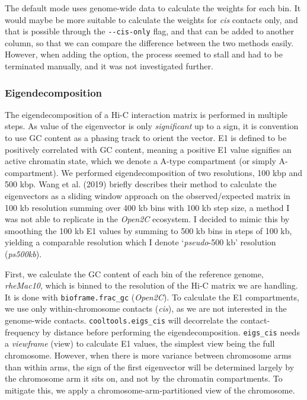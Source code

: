 \documentclass[
  11pt,
  a4paper,
]{scrbook}
\begin{document}
The default mode uses genome-wide data to calculate the weights for each
bin. It would maybe be more suitable to calculate the weights for
\emph{cis} contacts only, and that is possible through the
\texttt{-\/-cis-only} flag, and that can be added to another column, so
that we can compare the difference between the two methods easily.
However, when adding the option, the process seemed to stall and had to
be terminated manually, and it was not investigated further.

\subsubsection{Eigendecomposition}\label{sec-methods-eigendecomposition}

The eigendecomposition of a Hi-C interaction matrix is performed in
multiple steps. As value of the eigenvector is only \emph{significant}
up to a sign, it is convention to use GC content as a phasing track to
orient the vector. E1 is defined to be positively correlated with GC
content, meaning a positive E1 value signifies an active chromatin
state, which we denote a A-type compartment (or simply A-compartment).
We performed eigendecomposition of two resolutions, 100 kbp and 500 kbp.
Wang et al. (2019) briefly describes their method to calculate the
eigenvectors as a sliding window approach on the observed/expected
matrix in 100 kb resolution summing over 400 kb bins with 100 kb step
size, a method I was not able to replicate in the \emph{Open2C}
ecosystem. I decided to mimic this by smoothing the 100 kb E1 values by
summing to 500 kb bins in steps of 100 kb, yielding a comparable
resolution which I denote `\emph{pseudo}-500 kb' resolution
(\emph{ps500kb}).

First, we calculate the GC content of each bin of the reference genome,
\emph{rheMac10}, which is binned to the resolution of the Hi-C matrix we
are handling. It is done with \texttt{bioframe.frac\_gc}
(\emph{Open2C}). To calculate the E1 compartments, we use only
within-chromosome contacts (\emph{cis}), as we are not interested in the
genome-wide contacts. \texttt{cooltools.eigs\_cis} will decorrelate the
contact-frequency by distance before performing the eigendecomposition.
\texttt{eigs\_cis} needs a \emph{viewframe} (view) to calculate E1
values, the simplest view being the full chromosome. However, when there
is more variance between chromosome arms than within arms, the sign of
the first eigenvector will be determined largely by the chromosome arm
it sits on, and not by the chromatin compartments. To mitigate this, we
apply a chromosome-arm-partitioned view of the chromosome.
\end{document}
